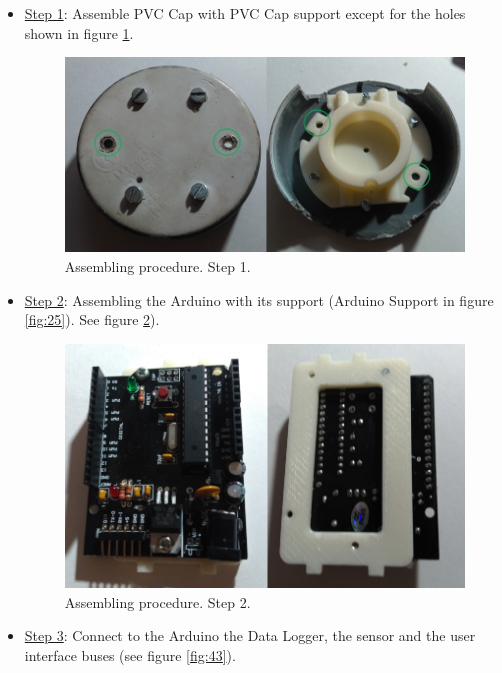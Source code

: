 \documentclass[12pt,letterpaper]{article}
\numberwithin{figure}{section}
\numberwithin{equation}{section}
\numberwithin{table}{section}
\begin{document}
\begin{itemize}
\item \underline{Step 1}: Assemble PVC Cap with PVC Cap support except for the holes shown in figure \ref{fig:41}.

    \begin{figure}[H]
        \centering
        \includegraphics[scale=0.6]{Figuras/figure_41.jpg}
        \caption{Assembling procedure. Step 1.}
        \label{fig:41}    
    \end{figure}
    
    \item \underline{Step 2}: Assembling the Arduino with its support (Arduino Support in figure \ref{fig:25}). See figure \ref{fig:42}).
    
    \begin{figure}[H]
        \centering
        \includegraphics[scale=0.5]{Figuras/figure_42.jpg}
        \caption{Assembling procedure. Step 2.}
        \label{fig:42}    
    \end{figure}
    
\item \underline{Step 3}: Connect to the Arduino the Data Logger, the sensor and the user interface buses (see figure \ref{fig:43}).


\end{itemize}
\end{document}
